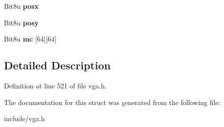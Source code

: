 \begin{DoxyCompactItemize}
\item 
\hypertarget{structVGA__HWCURSOR_abf50682342447c46dd13676cd0596281}{Bit8u {\bfseries posx}}\label{structVGA__HWCURSOR_abf50682342447c46dd13676cd0596281}

\item 
\hypertarget{structVGA__HWCURSOR_a436c666c0e7ef856d7ca98a6e5f30bd0}{Bit8u {\bfseries posy}}\label{structVGA__HWCURSOR_a436c666c0e7ef856d7ca98a6e5f30bd0}

\item 
\hypertarget{structVGA__HWCURSOR_a8c67327cfdedc8e3cb9a1a1d4d1d0e20}{Bit8u {\bfseries mc} \mbox{[}64\mbox{]}\mbox{[}64\mbox{]}}\label{structVGA__HWCURSOR_a8c67327cfdedc8e3cb9a1a1d4d1d0e20}

\end{DoxyCompactItemize}


\subsection{Detailed Description}


Definition at line 521 of file vga.\-h.



The documentation for this struct was generated from the following file\-:\begin{DoxyCompactItemize}
\item 
include/vga.\-h\end{DoxyCompactItemize}
